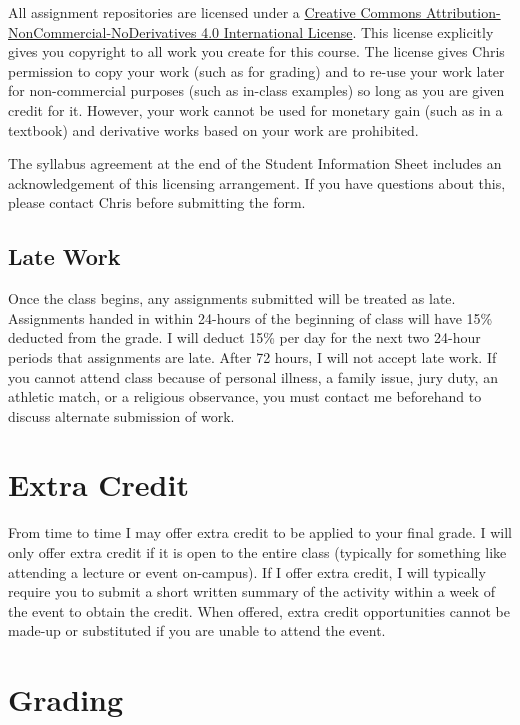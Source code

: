 \documentclass[]{book}
\begin{document}
All assignment repositories are licensed under a \href{https://creativecommons.org/licenses/by-nc-nd/4.0/}{Creative Commons Attribution-NonCommercial-NoDerivatives 4.0 International License}. This license explicitly gives you copyright to all work you create for this course. The license gives Chris permission to copy your work (such as for grading) and to re-use your work later for non-commercial purposes (such as in-class examples) so long as you are given credit for it. However, your work cannot be used for monetary gain (such as in a textbook) and derivative works based on your work are prohibited.

The syllabus agreement at the end of the Student Information Sheet includes an acknowledgement of this licensing arrangement. If you have questions about this, please contact Chris before submitting the form.

\hypertarget{late-work}{%
\subsection{Late Work}\label{late-work}}

Once the class begins, any assignments submitted will be treated as late. Assignments handed in within 24-hours of the beginning of class will have 15\% deducted from the grade. I will deduct 15\% per day for the next two 24-hour periods that assignments are late. After 72 hours, I will not accept late work. If you cannot attend class because of personal illness, a family issue, jury duty, an athletic match, or a religious observance, you must contact me beforehand to discuss alternate submission of work.

\hypertarget{extra-credit}{%
\section{Extra Credit}\label{extra-credit}}

From time to time I may offer extra credit to be applied to your final grade. I will only offer extra credit if it is open to the entire class (typically for something like attending a lecture or event on-campus). If I offer extra credit, I will typically require you to submit a short written summary of the activity within a week of the event to obtain the credit. When offered, extra credit opportunities cannot be made-up or substituted if you are unable to attend the event.

\hypertarget{grading}{%
\section{Grading}\label{grading}}
\end{document}
